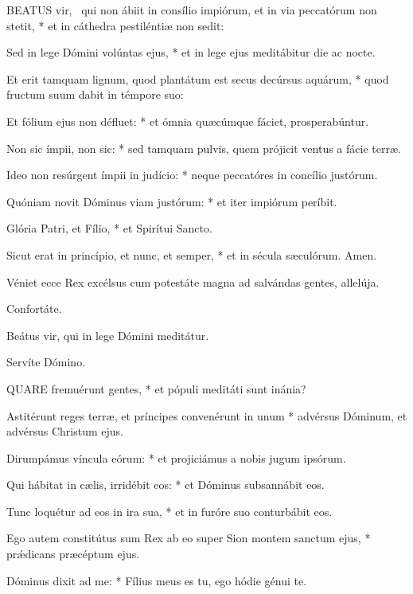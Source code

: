 
\lettrine[lines=2]{B}{EATUS} vir, \textdagger\ qui non ábiit in consílio impiórum, et in via peccatórum non stetit, * et in cáthedra pestiléntiæ non sedit:

Sed in lege Dómini volúntas ejus, * et in lege ejus meditábitur die ac nocte.

Et erit tamquam lignum, quod plantátum est secus decúrsus aquárum, * quod fructum suum dabit in témpore suo:

Et fólium ejus non défluet: * et ómnia quæcúmque fáciet, prosperabúntur.

Non sic ímpii, non sic: * sed tamquam pulvis, quem prójicit ventus a fácie terræ.

Ideo non resúrgent ímpii in judício: * neque peccatóres in concílio justórum.

Quóniam novit Dóminus viam justórum: * et iter impiórum períbit.

Glória Patri, et Fílio, * et Spirítui Sancto.

Sicut erat in princípio, et nunc, et semper, * et in sécula sæculórum. Amen.


  Véniet ecce Rex excélsus cum potestáte magna ad salvándas gentes, allelúja.

 Confortáte.

  Beátus vir, qui in lege Dómini meditátur.

 Servíte Dómino.


\lettrine[lines=2]{Q}{UARE} fremuérunt gentes, * et pópuli meditáti sunt inánia?

Astitérunt reges terræ, et príncipes convenérunt in unum * advérsus Dóminum, et advérsus Christum ejus.

Dirumpámus víncula eórum: * et projiciámus a nobis jugum ipsórum.

Qui hábitat in cælis, irridébit eos: * et Dóminus subsannábit eos.

Tunc loquétur ad eos in ira sua, * et in furóre suo conturbábit eos.

Ego autem constitútus sum Rex ab eo super Sion montem sanctum ejus, * prǽdicans præcéptum ejus.

Dóminus dixit ad me: * Fílius meus es tu, ego hódie génui te.

